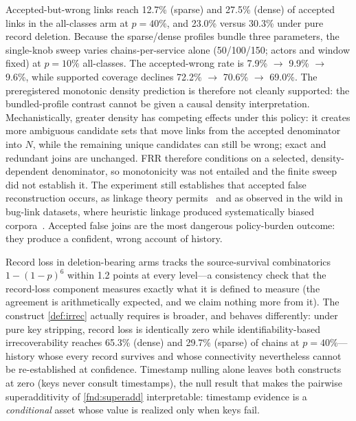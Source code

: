 \begin{finding}
\label{fnd:false}
Accepted-but-wrong links reach 12.7\% (sparse) and 27.5\% (dense) of accepted
links in the all-classes arm at $p{=}40\%$, and 23.0\% versus 30.3\% under pure
record deletion. Because the sparse/dense profiles bundle three parameters,
the single-knob sweep varies chains-per-service alone (50/100/150; actors and
window fixed) at $p{=}10\%$ all-classes. The accepted-wrong rate is
7.9\% $\to$ 9.9\% $\to$ 9.6\%, while supported coverage declines
72.2\% $\to$ 70.6\% $\to$ 69.0\%. The preregistered monotonic density prediction
is therefore not cleanly supported: the bundled-profile contrast cannot be given a
causal density interpretation. Mechanistically, greater density has competing
effects under this policy: it creates more ambiguous candidate sets that move links
from the accepted denominator into $N$, while the remaining unique candidates can
still be wrong; exact and redundant joins are unchanged. FRR therefore conditions
on a selected, density-dependent denominator, so monotonicity was not entailed and
the finite sweep did not establish it. The experiment still establishes that accepted
false reconstruction occurs, as linkage theory permits~\cite{fellegi1969} and as
observed in the wild in bug-link datasets,
where heuristic linkage produced systematically biased
corpora~\cite{bird2009,bachmann2010}. Accepted false joins are the most dangerous
policy-burden outcome: they produce a confident, wrong account of history.
\end{finding}

\begin{finding}
\label{fnd:constructs}
Record loss in deletion-bearing arms tracks the source-survival combinatorics
$1-(1-p)^{6}$ within 1.2 points at every level---a consistency check that the
record-loss component measures exactly what it is defined to measure (the
agreement is arithmetically expected, and we claim nothing more from it).
The construct \cref{def:irrec} actually requires is broader, and behaves
differently: under pure key stripping, record loss is identically zero while
identifiability-based irrecoverability reaches 65.3\% (dense) and 29.7\%
(sparse) of chains at $p{=}40\%$---history whose every record survives and
whose connectivity nevertheless cannot be re-established at confidence.
Timestamp nulling alone leaves both constructs at zero (keys never consult
timestamps), the null result that makes the pairwise superadditivity of
\cref{fnd:superadd} interpretable: timestamp evidence is a \emph{conditional}
asset whose value is realized only when keys fail.
\end{finding}

